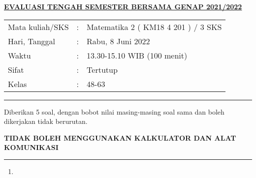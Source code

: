 \documentclass[10pt,openany,a4paper]{article}
\begin{document}
    \begin{center}
	{\underline{\textbf{\MakeUppercase{Evaluasi Tengah Semester Bersama Genap 2021/2022}}}}
    \end{center}

    \begin{center}
	\begin{tabular}{lcl}
		Mata kuliah/SKS & : & Matematika 2 ( KM18 4 201 ) / 3 SKS\\
		Hari, Tanggal & : & Rabu, 8 Juni 2022\\
		Waktu & : & 13.30-15.10 WIB (100 menit)\\
		Sifat & : & Tertutup\\
		Kelas & : & 48-63
	\end{tabular}
    \end{center}
	
    \noindent\rule{\textwidth}{2.pt}
	
    \setlength{\parindent}{5pt}
    \par Diberikan 5 soal, dengan bobot nilai masing-masing soal sama dan boleh dikerjakan tidak berurutan.
    \setlength{\parindent}{5pt}
    \setlength{\parindent}{5pt}
    \par \textbf{\MakeUppercase{Tidak boleh menggunakan kalkulator dan alat komunikasi}}
    \par {}
	
    \noindent\rule{\textwidth}{2.pt}
	
    \begin{enumerate}
        \item 
    \end{enumerate}
\end{document}
